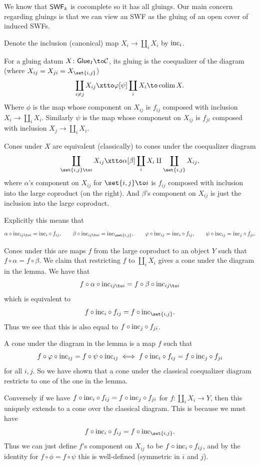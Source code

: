 We know that ${\sf SWF}_k$ is cocomplete so it has all gluings.
Our main concern regarding gluings is that we can view an SWF as the gluing of an open cover of induced SWFs.

Denote the inclusion (canonical) map $X_i\to\coprod_iX_i$ by ${\rm inc}_i$.

\blemm

    For a gluing datum $X\colon\glue_I\to\C$, its gluing is the coequalizer of the diagram (where $X_{ij}=X_{ji}=X_{\set{i,j}}$)
    $$ \coprod_{i\neq j}X_{ij} \xtto\phi[\psi] \coprod_iX_i \to \colim X . $$
    Where $\phi$ is the map whose component on $X_{ij}$ is $f_{ij}$ composed with inclusion $X_i\to\coprod_iX_i$.
    Similarly $\psi$ is the map whose component on $X_{ij}$ is $f_{ji}$ composed with inclusion $X_j\to\coprod_iX_i$.

\elemm

\bproof

    Cones under $X$ are equivalent (classically) to cones under the coequalizer diagram
    $$ \coprod_{\set{i,j}\to i}X_{ij} \xtto\alpha[\beta] \coprod_iX_i\amalg\coprod_{\set{i,j}}X_{ij}, $$
    where $\alpha$'s component on $X_{ij}$ for $\set{i,j}\to i$ is $f_{ij}$ composed with inclusion into the large coproduct (on the right).
    And $\beta$'s component on $X_{ij}$ is just the inclusion into the large coproduct.

    Explicitly this means that
    $$ \alpha\circ\inc_{ij\to i} = \inc_i\circ f_{ij},\qquad \beta\circ\inc_{ij\to i} = \inc_{\set{i,j}},\qquad \phi\circ\inc_{ij} = \inc_i\circ f_{ij},\qquad \psi\circ\inc_{ij} = \inc_j\circ f_{ji} . $$

    Cones under this are maps $f$ from the large coproduct to an object $Y$ such that $f\circ\alpha=f\circ\beta$.
    We claim that restricting $f$ to $\coprod_iX_i$ gives a cone under the diagram in the lemma.
    We have that
    $$ f\circ\alpha\circ\inc_{ij\to i} = f\circ\beta\circ\inc_{ij\to i} $$
    which is equivalent to
    $$ f\circ\inc_i\circ f_{ij} = f\circ\inc_{\set{i,j}} . $$
    Thus we see that this is also equal to $f\circ{\rm inc}_j\circ f_{ji}$.

    A cone under the diagram in the lemma is a map $f$ such that
    $$ f\circ\varphi\circ{\rm inc}_{ij} = f\circ\psi\circ{\rm inc}_{ij} \iff f\circ{\rm inc}_i\circ f_{ij} = f\circ{\rm inc}_j\circ f_{ji} $$
    for all $i,j$.
    So we have shown that a cone under the classical coequalizer diagram restricts to one of the one in the lemma.

    Conversely if we have $f\circ{\rm inc}_i\circ f_{ij}=f\circ{\rm inc}_j\circ f_{ji}$ for $f\colon\coprod_iX_i\to Y$, then this uniquely extends to a cone over the classical diagram.
    This is because we must have
    $$ f\circ\inc_i\circ f_{ij} = f\circ\inc_{\set{i,j}} . $$
    Thus we can just define $f$'s component on $X_{ij}$ to be $f\circ{\rm inc}_i\circ f_{ij}$, and by the identity for $f\circ\phi=f\circ\psi$ this is well-defined (symmetric in $i$ and $j$).

